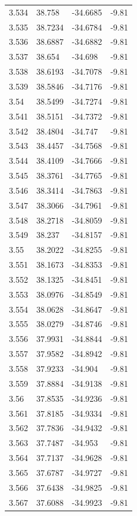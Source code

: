 \begin{tabular}{llll}
3.534 & 38.758 & -34.6685 & -9.81 \\
3.535 & 38.7234 & -34.6784 & -9.81 \\
3.536 & 38.6887 & -34.6882 & -9.81 \\
3.537 & 38.654 & -34.698 & -9.81 \\
3.538 & 38.6193 & -34.7078 & -9.81 \\
3.539 & 38.5846 & -34.7176 & -9.81 \\
3.54 & 38.5499 & -34.7274 & -9.81 \\
3.541 & 38.5151 & -34.7372 & -9.81 \\
3.542 & 38.4804 & -34.747 & -9.81 \\
3.543 & 38.4457 & -34.7568 & -9.81 \\
3.544 & 38.4109 & -34.7666 & -9.81 \\
3.545 & 38.3761 & -34.7765 & -9.81 \\
3.546 & 38.3414 & -34.7863 & -9.81 \\
3.547 & 38.3066 & -34.7961 & -9.81 \\
3.548 & 38.2718 & -34.8059 & -9.81 \\
3.549 & 38.237 & -34.8157 & -9.81 \\
3.55 & 38.2022 & -34.8255 & -9.81 \\
3.551 & 38.1673 & -34.8353 & -9.81 \\
3.552 & 38.1325 & -34.8451 & -9.81 \\
3.553 & 38.0976 & -34.8549 & -9.81 \\
3.554 & 38.0628 & -34.8647 & -9.81 \\
3.555 & 38.0279 & -34.8746 & -9.81 \\
3.556 & 37.9931 & -34.8844 & -9.81 \\
3.557 & 37.9582 & -34.8942 & -9.81 \\
3.558 & 37.9233 & -34.904 & -9.81 \\
3.559 & 37.8884 & -34.9138 & -9.81 \\
3.56 & 37.8535 & -34.9236 & -9.81 \\
3.561 & 37.8185 & -34.9334 & -9.81 \\
3.562 & 37.7836 & -34.9432 & -9.81 \\
3.563 & 37.7487 & -34.953 & -9.81 \\
3.564 & 37.7137 & -34.9628 & -9.81 \\
3.565 & 37.6787 & -34.9727 & -9.81 \\
3.566 & 37.6438 & -34.9825 & -9.81 \\
3.567 & 37.6088 & -34.9923 & -9.81 \\

\end{tabular}
